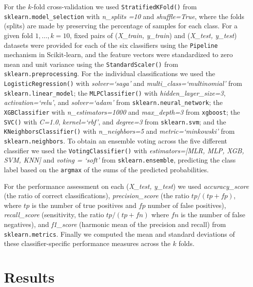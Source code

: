 \documentclass[10pt,letterpaper]{article}
\begin{document}
{{For the $k$-fold cross-validation we used  {\tt \small StratifiedKFold()}  from {\tt \small sklearn.model\_selection}  with {\it n\_splits =10} and {\it shuffle=True}, 
where the folds (splits) are made by preserving the percentage of samples for each class. For a given fold $1,\ldots,k=10$, 
fixed pairs of ({\it X\_train, y\_train}) and ({\it X\_test, y\_test}) datasets were provided for each of the six classifiers 
using the {\tt Pipeline} mechanism in Scikit-learn, and the feature vectors were standardized to zero mean and unit variance using the
{\tt \small StandardScaler()} from {\tt \small sklearn.preprocessing}.
For the individual classifications we used the {\tt \small LogisticRegression()} with {\it solver=`saga'} and {\it multi\_class=`multinomial'} from  
{\tt \small sklearn.linear\_model};  the
{\tt \small MLPClassifier()} with {\it hidden\_layer\_size=3}, {\it activation=`relu'}, and {\it solver=`adam'} from {\tt \small sklearn.neural\_network}; 
the {\tt \small XGBClassifier} with {\it n\_estimators=1000} and {\it max\_depth=3} from {\tt \small xgboost}; 
the {\tt \small SVC()} with {\it C=1.0}, {\it kernel=`rbf'}, and {\it degree=3} from {\tt \small sklearn.svm};  and the {\tt \small KNeighborsClassifier()} with
{\it n\_neighbors=5} and {\it metric=`minkowski'} from {\tt \small sklearn.neighbors}. 
To obtain an ensemble voting across the five different classifier we used the  {\tt VotingClassifier()}  with 
{\it estimators=[MLR, MLP, XGB, SVM, KNN]} and {\it  voting = `soft'}  from {\tt \small sklearn.ensemble},
predicting the class label based on the {\tt \small argmax} of the sums of the predicted probabilities.

For the performance assessment on each ({\it X\_test, y\_test}) we used {\it accuracy\_score} (the ratio of correct classifications), {\it precision\_score} 
(the ratio $tp / (tp + f\!p)$, where $tp$ is the number of true positives and $f\!p$ number of false positives), {\it recall\_score} (sensitivity, the ratio $tp / (tp + f\!n)$ 
where $f\!n$ is the number of false negatives), and {\it f1\_score} (harmonic mean of the precision and recall) from {\tt sklearn.metrics}.
Finally we computed the mean and standard deviations of these classifier-specific performance measures across the $k$ folds. 


\vspace{5mm}


\section*{Results}

}}
\end{document}
